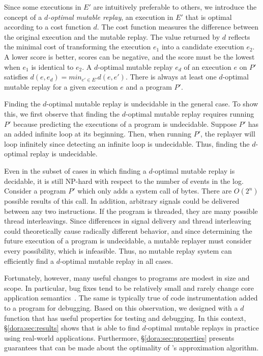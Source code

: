 Since some executions in $E'$ are intuitively preferable to others, we introduce the
concept of a \emph{$d$-optimal mutable replay}, an execution in $E'$
that is optimal according to a cost function $d$.  The cost function
measures the difference between the original execution
and the mutable replay.  The value returned by $d$ reflects the minimal cost
of transforming the execution $e_1$ into a candidate execution
$e_2$. A lower score is better, scores can be negative, and the score
must be the lowest when $e_1$ is identical to $e_2$. A $d$-optimal
mutable replay $e_{d}$ of an execution $e$ on $P'$ satisfies $d(e, e_{d}) = min_{e' \in E'}
d(e, e')$. There is always at least one $d$-optimal mutable replay for
a given execution $e$ and a program $P'$.

Finding the $d$-optimal mutable replay is undecidable in the general
case. To show this, we first observe that finding the $d$-optimal mutable
replay requires running $P'$ because predicting the executions of a
program is undecidable. Suppose $P'$ has an added infinite loop at its
beginning. Then, when running $P'$, the replayer will loop infinitely
since detecting an infinite loop is undecidable. Thus, finding the $d$-optimal
replay is undecidable.

Even in the subset of cases in which finding a $d$-optimal mutable
replay is decidable, it is still NP-hard with respect to the number of events in
the log. Consider a program $P'$
which only adds a  system call of  bytes. There are
$O(2^{n})$ possible results of this call. In addition, arbitrary signals could be
delivered between any two instructions. If the program is threaded,
they are many possible thread interleavings. Since
differences in signal delivery and thread interleaving could
theoretically cause radically different behavior, and since determining the
future execution of a program is undecidable, a mutable replayer must
consider every possibility, which is infeasible. Thus, no mutable replay system
can efficiently find a $d$-optimal mutable replay in all cases.

Fortunately, however, many useful changes to programs are modest in size and scope.
In particular, bug fixes tend to be relatively small and rarely change
core application semantics~\cite{delta,mreplay-feas}.  The same is
typically true of code instrumentation added to a program for
debugging. Based on this observation, we designed {\dora} with a
$d$ function that has useful properties for testing and debugging.  In
this context, \S\ref{dora:sec:results} shows that {\dora} is able
to find $d$-optimal mutable replays in practice using real-world
applications. Furthermore, \S\ref{dora:sec:properties} presents
guarantees that can be made about the optimality of {\dora}'s
approximation algorithm.


